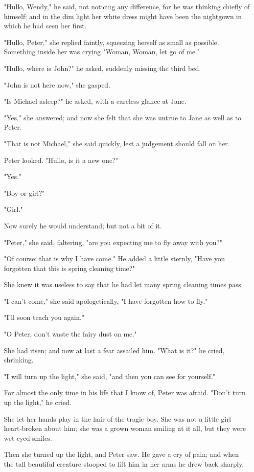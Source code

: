 "Hullo, Wendy," he said, not noticing any difference, for he was thinking chiefly of himself;
and in the dim light her white dress might have been the nightgown in which he had seen her first.

"Hullo, Peter," she replied faintly, squeezing herself as small as possible.
Something inside her was crying "Woman, Woman, let go of me."

"Hullo, where is John?\@" he asked, suddenly missing the third bed.

"John is not here now," she gasped.

"Is Michael asleep?\@" he asked, with a careless glance at Jane.

"Yes," she answered;
and now she felt that she was untrue to Jane as well as to Peter.

"That is not Michael," she said quickly, lest a judgement should fall on her.

Peter looked.
"Hullo, is it a new one?"

"Yes."

"Boy or girl?"

"Girl."

Now surely he would understand;
but not a bit of it.

"Peter," she said, faltering, "are you expecting me to fly away with you?"

"Of course;
that is why I have come."
He added a little sternly, "Have you forgotten that this is spring cleaning time?"

She knew it was useless to say that he had let many spring cleaning times pass.

"I can't come," she said apologetically, "I have forgotten how to fly."

"I'll soon teach you again."

"O Peter, don't waste the fairy dust on me."

She had risen;
and now at last a fear assailed him.
"What is it?\@" he cried, shrinking.

"I will turn up the light," she said, "and then you can see for yourself."

For almost the only time in his life that I know of, Peter was afraid.
"Don't turn up the light," he cried.

She let her hands play in the hair of the tragic boy.
She was not a little girl heart-broken about him;
she was a grown woman smiling at it all, but they were wet eyed smiles.

Then she turned up the light, and Peter saw.
He gave a cry of pain;
and when the tall beautiful creature stooped to lift him in her arms he drew back sharply.

